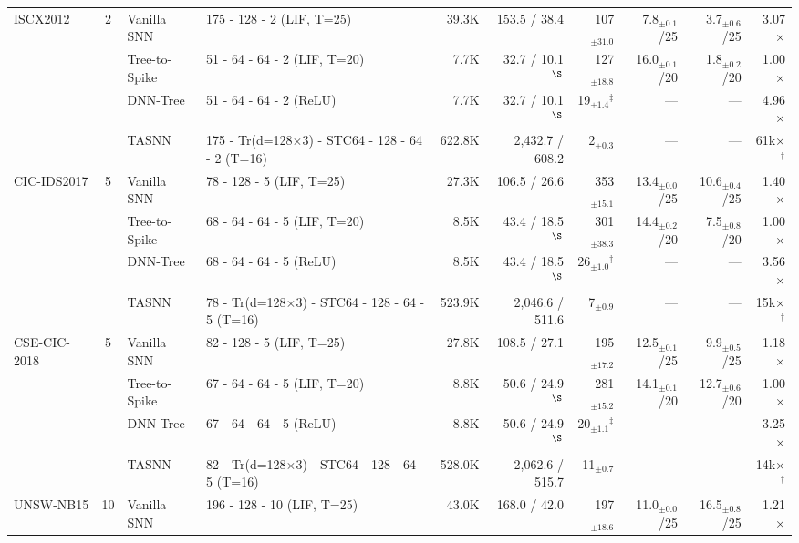 \begin{table}[!ht]
{\begin{tabular}{l c l l r r r r r r}
\midrule
\multirow{4}{*}{ISCX2012} & \multirow{4}{*}{2}
  & Vanilla SNN   & 175 - 128 - 2 (LIF, T=25) & 39.3K & 153.5 / 38.4 & 107$_{\pm31.0}$ & 7.8$_{\pm0.1}$/25 & 3.7$_{\pm0.6}$/25 & 3.07$\times$ \\
& & Tree-to-Spike & 51 - 64 - 64 - 2 (LIF, T=20) & 7.7K & 32.7 / 10.1$^{\S}$ & 127$_{\pm18.8}$ & 16.0$_{\pm0.1}$/20 & 1.8$_{\pm0.2}$/20 & 1.00$\times$ \\
& & DNN-Tree      & 51 - 64 - 64 - 2 (ReLU) & 7.7K & 32.7 / 10.1$^{\S}$ & 19$_{\pm1.4}$$^\ddagger$ & --- & --- & 4.96$\times$ \\
& & TASNN         & 175 - Tr(d=128$\times$3) - STC64 - 128 - 64 - 2 (T=16) & 622.8K & 2,432.7 / 608.2 & 2$_{\pm0.3}$ & --- & --- & 61k$\times$$^\dagger$ \\
\midrule
\multirow{4}{*}{CIC-IDS2017} & \multirow{4}{*}{5}
  & Vanilla SNN   & 78 - 128 - 5 (LIF, T=25) & 27.3K & 106.5 / 26.6 & 353$_{\pm15.1}$ & 13.4$_{\pm0.0}$/25 & 10.6$_{\pm0.4}$/25 & 1.40$\times$ \\
& & Tree-to-Spike & 68 - 64 - 64 - 5 (LIF, T=20) & 8.5K & 43.4 / 18.5$^{\S}$ & 301$_{\pm38.3}$ & 14.4$_{\pm0.2}$/20 & 7.5$_{\pm0.8}$/20 & 1.00$\times$ \\
& & DNN-Tree      & 68 - 64 - 64 - 5 (ReLU) & 8.5K & 43.4 / 18.5$^{\S}$ & 26$_{\pm1.0}$$^\ddagger$ & --- & --- & 3.56$\times$ \\
& & TASNN         & 78 - Tr(d=128$\times$3) - STC64 - 128 - 64 - 5 (T=16) & 523.9K & 2,046.6 / 511.6 & 7$_{\pm0.9}$ & --- & --- & 15k$\times$$^\dagger$ \\
\midrule
\multirow{4}{*}{CSE-CIC-2018} & \multirow{4}{*}{5}
  & Vanilla SNN   & 82 - 128 - 5 (LIF, T=25) & 27.8K & 108.5 / 27.1 & 195$_{\pm17.2}$ & 12.5$_{\pm0.1}$/25 & 9.9$_{\pm0.5}$/25 & 1.18$\times$ \\
& & Tree-to-Spike & 67 - 64 - 64 - 5 (LIF, T=20) & 8.8K & 50.6 / 24.9$^{\S}$ & 281$_{\pm15.2}$ & 14.1$_{\pm0.1}$/20 & 12.7$_{\pm0.6}$/20 & 1.00$\times$ \\
& & DNN-Tree      & 67 - 64 - 64 - 5 (ReLU) & 8.8K & 50.6 / 24.9$^{\S}$ & 20$_{\pm1.1}$$^\ddagger$ & --- & --- & 3.25$\times$ \\
& & TASNN         & 82 - Tr(d=128$\times$3) - STC64 - 128 - 64 - 5 (T=16) & 528.0K & 2,062.6 / 515.7 & 11$_{\pm0.7}$ & --- & --- & 14k$\times$$^\dagger$ \\
\midrule
\multirow{4}{*}{UNSW-NB15} & \multirow{4}{*}{10}
  & Vanilla SNN   & 196 - 128 - 10 (LIF, T=25) & 43.0K & 168.0 / 42.0 & 197$_{\pm18.6}$ & 11.0$_{\pm0.0}$/25 & 16.5$_{\pm0.8}$/25 & 1.21$\times$ \\

\end{tabular}}
\end{table}
